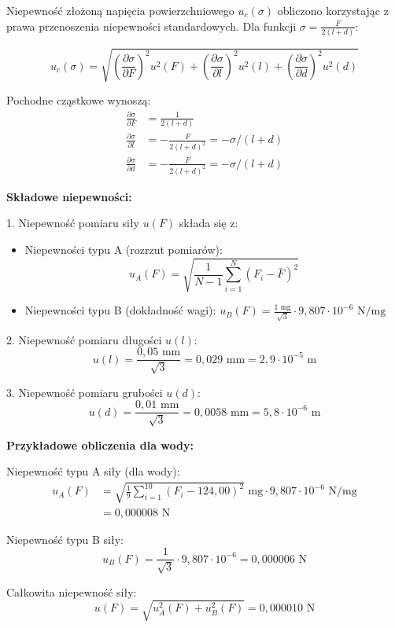 \documentclass[a4paper,12pt]{article}
\begin{document}
Niepewność złożoną napięcia powierzchniowego $u_c(\sigma)$ obliczono korzystając z prawa przenoszenia niepewności standardowych. Dla funkcji $\sigma = \frac{F}{2(l+d)}$:

$$
    u_c(\sigma) = \sqrt{\left(\frac{\partial \sigma}{\partial F}\right)^2 u^2(F) + \left(\frac{\partial \sigma}{\partial l}\right)^2 u^2(l) + \left(\frac{\partial \sigma}{\partial d}\right)^2 u^2(d)}
$$

Pochodne cząstkowe wynoszą:
\begin{align*}
    \frac{\partial \sigma}{\partial F} & = \frac{1}{2(l+d)}                    \\
    \frac{\partial \sigma}{\partial l} & = -\frac{F}{2(l+d)^2} = -\sigma/(l+d) \\
    \frac{\partial \sigma}{\partial d} & = -\frac{F}{2(l+d)^2} = -\sigma/(l+d)
\end{align*}

\noindent\textbf{Składowe niepewności:}

1. Niepewność pomiaru siły $u(F)$ składa się z:
\begin{itemize}
    \item Niepewności typu A (rozrzut pomiarów):
          $$u_A(F) = \sqrt{\frac{1}{N-1} \sum_{i=1}^{N} (F_i - \bar{F})^2}$$
    \item Niepewności typu B (dokładność wagi): $u_B(F) = \frac{1 \text{ mg}}{\sqrt{3}} \cdot 9{,}807 \cdot 10^{-6} \text{ N/mg}$
\end{itemize}

2. Niepewność pomiaru długości $u(l)$:
$$u(l) = \frac{0{,}05 \text{ mm}}{\sqrt{3}} = 0{,}029 \text{ mm} = 2{,}9 \cdot 10^{-5} \text{ m}$$

3. Niepewność pomiaru grubości $u(d)$:
$$u(d) = \frac{0{,}01 \text{ mm}}{\sqrt{3}} = 0{,}0058 \text{ mm} = 5{,}8 \cdot 10^{-6} \text{ m}$$

\noindent\textbf{Przykładowe obliczenia dla wody:}

Niepewność typu A siły (dla wody):
\begin{align*}
    u_A(F) & = \sqrt{\frac{1}{9} \sum_{i=1}^{10} (F_i - 124{,}00)^2} \text{ mg} \cdot 9{,}807 \cdot 10^{-6} \text{ N/mg} \\
           & = 0{,}000008 \text{ N}
\end{align*}

Niepewność typu B siły:
$$u_B(F) = \frac{1}{\sqrt{3}} \cdot 9{,}807 \cdot 10^{-6} = 0{,}000006 \text{ N}$$

Całkowita niepewność siły:
$$u(F) = \sqrt{u_A^2(F) + u_B^2(F)} = 0{,}000010 \text{ N}$$
\end{document}
